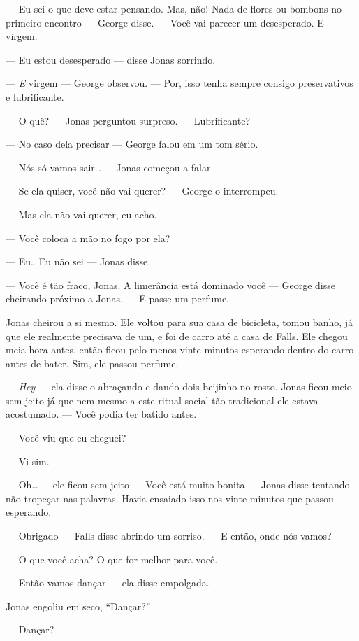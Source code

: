 --- Eu sei o que deve estar pensando. Mas, não! Nada de flores ou bombons no primeiro encontro --- George disse. --- Você vai parecer um desesperado. E virgem.

--- Eu estou desesperado --- disse Jonas sorrindo.

--- \emph{E} virgem --- George observou. --- Por, isso tenha sempre consigo preservativos e lubrificante.

--- O quê? --- Jonas perguntou surpreso. --- Lubrificante?

--- No caso dela precisar --- George falou em um tom sério.

--- Nós só vamos sair\ldots\,--- Jonas começou a falar.

--- Se ela quiser, você não vai querer? --- George o interrompeu.

--- Mas ela não vai querer, eu acho.

--- Você coloca a mão no fogo por ela?

--- Eu\ldots\,Eu não sei --- Jonas disse.

--- Você é tão fraco, Jonas. A limerância está dominado você --- George disse\mudanca{,} cheirando próximo a Jonas. --- E passe um perfume.

Jonas cheirou a si mesmo. Ele voltou para sua casa de bicicleta, tomou banho, já que ele realmente precisava de um, e foi de carro até a casa de Falls. Ele chegou meia hora antes, então ficou pelo menos vinte minutos esperando dentro do carro antes de bater. Sim, ele passou perfume.

--- \emph{Hey} --- ela disse o abraçando e dando dois beijinho no rosto. Jonas ficou meio sem jeito\mudanca{,} já que nem mesmo a este ritual social tão tradicional ele estava acostumado. --- Você podia ter batido antes.

--- Você viu que eu cheguei?

--- Vi\mudanca{,} sim.

--- Oh\ldots\,--- ele ficou sem jeito --- Você está muito bonita --- Jonas disse tentando não tropeçar nas palavras. Havia ensaiado isso nos vinte minutos que passou esperando.

--- Obrigado --- Falls disse abrindo um sorriso.  --- E então, onde nós vamos?

--- O que você acha? O que for melhor para você.

--- Então vamos dançar --- ela disse empolgada.

Jonas engoliu em seco, ``Dançar?''

--- Dançar?

